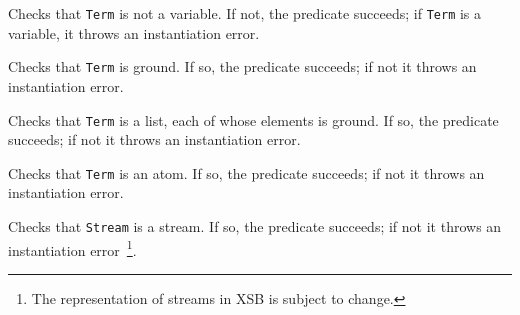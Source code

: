 \begin{description}
Checks that {\tt Term} is not a variable.  If not, the predicate succeeds;
if {\tt Term} is a variable,  it throws an instantiation error.

Checks that {\tt Term} is ground.  If so, the predicate succeeds;
if not it throws an instantiation error.

Checks that {\tt Term} is a list, each of whose elements is ground.
If so, the predicate succeeds; if not it throws an instantiation
error.
	    
Checks that {\tt Term} is an atom.  If so, the predicate succeeds;
if not it throws an instantiation error.

Checks that {\tt Stream} is a stream.  If so, the predicate succeeds;
if not it throws an instantiation error~\footnote{The representation
of streams in XSB is subject to change.}.

\end{description}

